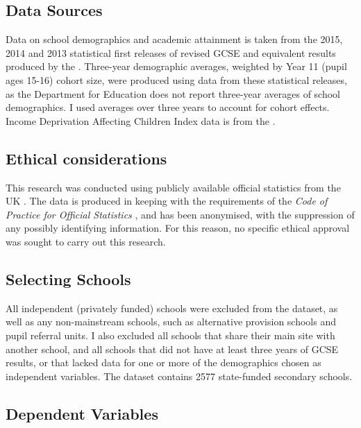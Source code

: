 \documentclass[12pt, a4paper]{article}
\begin{document}
\subsection{Data Sources}

Data on school demographics and academic attainment is taken from the 2015, 2014 and 2013 statistical first releases of revised GCSE and equivalent results produced by the \textcites{departmentforeducation2014b, departmentforeducation2015b, departmentforeducation2016}. Three-year demographic averages, weighted by Year 11 (pupil ages 15-16) cohort size, were produced using data from these statistical releases, as the Department for Education does not report three-year averages of school demographics. I used averages over three years to account for cohort effects. Income Deprivation Affecting Children Index data is from the \textcite{departmentforcommunitiesandlocalgovernment2015}.

\subsection{Ethical considerations}

This research was conducted using publicly available official statistics from the UK \textcites{departmentforeducation2014b, departmentforeducation2015b, departmentforeducation2016}. The data is produced in keeping with the requirements of the \emph{Code of Practice for Official Statistics} \autocites{ukstatisticsauthority2009}, and has been anonymised, with the suppression of any possibly identifying information. For this reason, no specific ethical approval was sought to carry out this research.

\subsection{Selecting Schools}

All independent (privately funded) schools were excluded from the dataset, as well as any non-mainstream schools, such as alternative provision schools and pupil referral units. I also excluded all schools that share their main site with another school, and all schools that did not have at least three years of GCSE results, or that lacked data for one or more of the demographics chosen as independent variables. The dataset contains 2577 state-funded secondary schools.

\subsection{Dependent Variables}
\end{document}
